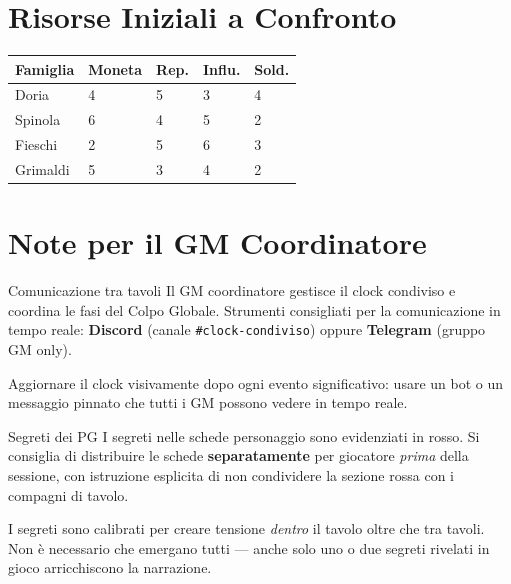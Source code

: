 \section{Risorse Iniziali a Confronto}
\label{sec:ref-risorse}

\begin{center}
\begin{tabular}{L{2.5cm} C{1.5cm} C{1.5cm} C{1.5cm} C{1.5cm}}
  \toprule
  \textbf{Famiglia} & \textbf{Moneta} & \textbf{Rep.} & \textbf{Influ.} & \textbf{Sold.} \\
  \midrule
  Doria    & 4 & 5 & 3 & 4 \\
  Spinola  & 6 & 4 & 5 & 2 \\
  Fieschi  & 2 & 5 & 6 & 3 \\
  Grimaldi & 5 & 3 & 4 & 2 \\
  \bottomrule
\end{tabular}
\end{center}

\section{Note per il GM Coordinatore}
\label{sec:ref-coordinatore}

\begin{rulebox}[GoldRPG]{Comunicazione tra tavoli}
Il GM coordinatore gestisce il clock condiviso e coordina le fasi del Colpo Globale.
Strumenti consigliati per la comunicazione in tempo reale:
\textbf{Discord} (canale \texttt{\#clock-condiviso}) oppure
\textbf{Telegram} (gruppo GM only).

Aggiornare il clock visivamente dopo ogni evento significativo:
usare un bot o un messaggio pinnato che tutti i GM possono vedere in tempo reale.
\end{rulebox}

\begin{rulebox}[GoldRPG]{Segreti dei PG}
I segreti nelle schede personaggio sono evidenziati in rosso.
Si consiglia di distribuire le schede \textbf{separatamente} per giocatore
\textit{prima} della sessione, con istruzione esplicita di non condividere
la sezione rossa con i compagni di tavolo.

I segreti sono calibrati per creare tensione \textit{dentro} il tavolo
oltre che tra tavoli. Non è necessario che emergano tutti — anche solo
uno o due segreti rivelati in gioco arricchiscono la narrazione.
\end{rulebox}

